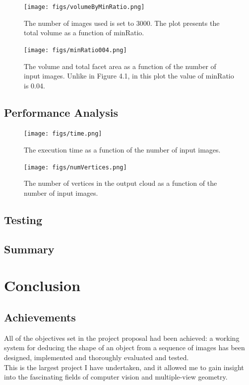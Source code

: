 \documentclass[12pt,a4paper,twoside,openright]{report}
\begin{document}
\begin{figure}
\begin{center}
\texttt{[image: figs/volumeByMinRatio.png]}	
\caption{The number of images used is set to 3000. The plot presents the total volume as a function of minRatio.}
\end{center}
\end{figure}

\begin{figure}
\begin{center}
\texttt{[image: figs/minRatio004.png]}	
\caption{The volume and total facet area as a function of the number of input images. Unlike in Figure 4.1, in this plot the value of minRatio is 0.04.}
\end{center}
\end{figure}

\section{Performance Analysis}
\begin{figure}
\begin{center}
\texttt{[image: figs/time.png]}	
\caption{The execution time as a function of the number of input images.}
\end{center}
\end{figure}
\begin{figure}
\begin{center}
\texttt{[image: figs/numVertices.png]}	
\caption{The number of vertices in the output cloud as a function of the number of input images.}
\end{center}
\end{figure}

\section{Testing}

\section{Summary}

\chapter{Conclusion}


\section{Achievements}
All of the objectives set in the project proposal had been achieved: a working system for deducing the shape of an object from a sequence of images has been designed, implemented and thoroughly evaluated and tested.\\
\linebreak
This is the largest project I have undertaken, and it allowed me to gain insight into the fascinating fields of computer vision and multiple-view geometry. 
\end{document}
